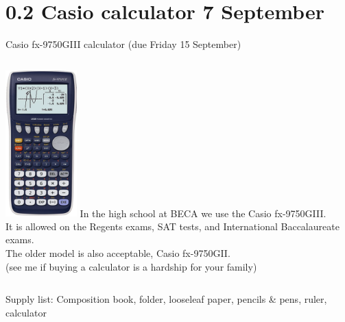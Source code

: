 \documentclass[onlytextwidth]{beamer}
\begin{document}
\section{0.2 Casio calculator \hfill 7 September}
\begin{frame}{Casio fx-9750GIII calculator (due Friday 15 September)}
  \begin{columns}
      \includegraphics[width=2.75cm]{../graphics/casio_fx-9750GII.png}
      In the high school at BECA we use the Casio fx-9750GIII.\\[5pt] 
      It is allowed on the Regents exams, SAT tests, and International Baccalaureate exams.\\[5pt]
      The older model is also acceptable, Casio fx-9750\alert{GII}.\\[5pt]
      (see me if buying a calculator is a hardship for your family)
    \end{columns} \vspace{1cm}
  Supply list: Composition book, folder, looseleaf paper, pencils \& pens, ruler, calculator
\end{frame}
\end{document}
